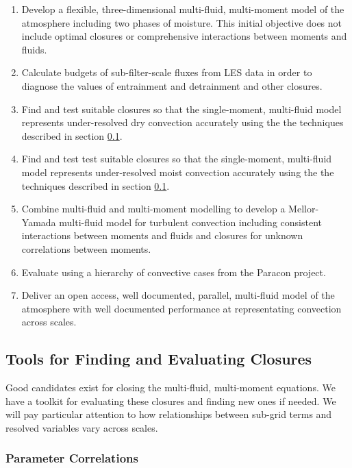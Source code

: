 \documentclass[11pt,a4paper]{article}
\begin{document}
\begin{enumerate}
\item\label{it:model} Develop a flexible, three-dimensional multi-fluid, multi-moment model of the atmosphere including two phases of moisture. This initial objective does not include optimal closures or comprehensive interactions between moments and fluids.

\item\label{it:budgets} Calculate budgets of sub-filter-scale fluxes from LES data in order to diagnose the values of entrainment and detrainment and other closures.

\item Find and test suitable closures so that the single-moment, multi-fluid model represents under-resolved dry convection accurately using the the techniques described in section \ref{sec:tools}.

\item Find and test test suitable closures so that the single-moment, multi-fluid model represents under-resolved moist convection accurately using the the techniques described in section \ref{sec:tools}. 

\item Combine multi-fluid and multi-moment modelling to develop a Mellor-Yamada multi-fluid model for turbulent convection including consistent interactions between moments and fluids and closures for unknown correlations between moments.

\item Evaluate using a hierarchy of convective cases from the Paracon project.

\item Deliver an open access, well documented, parallel, multi-fluid model of the atmosphere with well documented performance at representating convection across scales.
\end{enumerate}

\subsection{Tools for Finding and Evaluating Closures}
\label{sec:tools}

Good candidates exist for closing the multi-fluid, multi-moment equations. We have a toolkit for evaluating these closures and finding new ones if needed. We will pay particular attention to how relationships between sub-grid terms and resolved variables vary across scales. 

\subsubsection*{Parameter Correlations}
\end{document}
